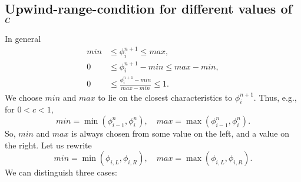 \documentclass[../thesis.tex]{subfiles}
\begin{document}
\subsection[]{Upwind-range-condition for different values of \(c\)}
In general
\begin{equation}
    \begin{split}
        min
        &\leq
        \phi_{i}^{n+1}
        \leq
        max,
        \\
        0
        &\leq
        \phi_{i}^{n+1} - min
        \leq
        max - min,
        \\
        0
        &\leq
        \frac{\phi_{i}^{n+1} - min}{max - min}
        \leq
        1.
    \end{split}
\end{equation}
We choose \(min\) and \(max\) to lie on the closest characteristics to \(\phi_{i}^{n+1}\). Thus, e.g.,
for \(0 < c < 1\),
\[
    min = \min(\phi_{i-1}^{n}, \phi_{i}^{n}),
    \quad
    max = \max(\phi_{i-1}^{n}, \phi_{i}^{n}).
\]
So, \(min\) and \(max\) is always chosen from some value on the left, and a value on the right.
Let us rewrite
\[
    min = \min(\phi_{i,L}, \phi_{i,R}),
    \quad
    max = \max(\phi_{i,L}, \phi_{i,R}).
\]
We can distinguish three cases:
\end{document}
